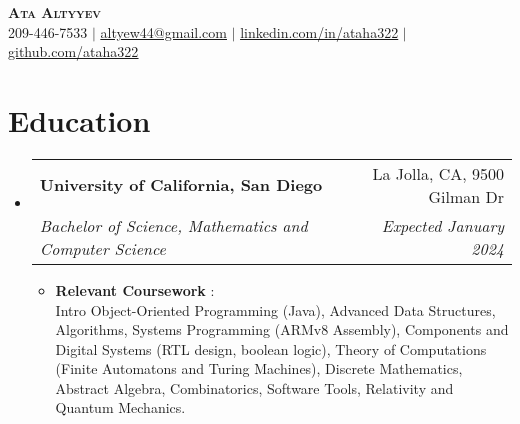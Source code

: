 \documentclass[letterpaper,11pt]{article}
\makeatletter
\newcommand{\resumeItem}[1]{
  \item\small{
    {#1 \vspace{-2pt}}
  }
}
\newcommand{\resumeSubheading}[4]{
  \vspace{-2pt}\item
    \begin{tabular*}{0.97\textwidth}[t]{l@{\extracolsep{\fill}}r}
      \textbf{#1} & #2 \\
      \textit{\small#3} & \textit{\small #4} \\
    \end{tabular*}\vspace{-7pt}
}
\newcommand{\resumeSubHeadingListStart}{\begin{itemize}[leftmargin=0.15in, label={}]}
\newcommand{\resumeSubHeadingListEnd}{\end{itemize}}
\newcommand{\resumeItemListStart}{\begin{itemize}}
\newcommand{\resumeItemListEnd}{\end{itemize}\vspace{-5pt}}
\makeatother
\begin{document}


\begin{center}
    \textbf{\Huge \scshape Ata Altyyev} \\ \vspace{1pt}
    \small 209-446-7533 $|$ \href{mailto:altyew44@gmail.com}{\underline{altyew44@gmail.com}} $|$ 
    \href{https://linkedin.com/in/ataha322}{\underline{linkedin.com/in/ataha322}} $|$
    \href{https://github.com/ataha322}{\underline{github.com/ataha322}}
\end{center}


\section{Education}
  \resumeSubHeadingListStart
    \resumeSubheading
      {University of California, San Diego}{La Jolla, CA, 9500 Gilman Dr}
      {Bachelor of Science, Mathematics and Computer Science}{Expected January 2024}
          \resumeItemListStart
            \resumeItem{\textbf{Relevant Coursework}}:\\
            Intro Object-Oriented Programming (Java), Advanced Data Structures, Algorithms, Systems Programming (ARMv8 Assembly), Components and Digital Systems (RTL design, boolean logic), Theory of Computations (Finite Automatons and Turing Machines), Discrete Mathematics, Abstract Algebra, Combinatorics, Software Tools, Relativity and Quantum Mechanics.
            
        \resumeItemListEnd

  \resumeSubHeadingListEnd


      
      
\end{document}
